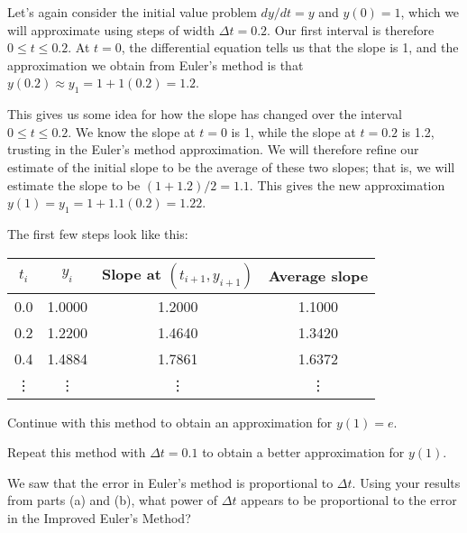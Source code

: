 \begin{exercises}
    Let's again consider the initial value problem $dy/dt = y$ and
    $y(0) = 1$, which we will approximate using steps of width $\Delta
    t = 0.2$.  Our first interval is therefore $0\leq t \leq 0.2$.  At
    $t=0$, the differential equation tells us that the slope is 1, and
    the approximation we obtain from Euler's method is that
    $y(0.2)\approx y_1= 1+ 1(0.2)= 1.2$.  

    This gives us some idea for how the slope has changed over the
    interval $0\leq t\leq 0.2$.  We know the slope at $t=0$ is 1,
    while the slope at $t=0.2$ is 1.2, trusting in the Euler's method
    approximation.  We will therefore refine our estimate of the
    initial slope to be the average of these two slopes;  that is, we
    will estimate the slope to be $(1+1.2)/2 = 1.1$.  This gives the
    new approximation $y(1) = y_1 = 1 + 1.1(0.2) = 1.22$.  

    The first few steps look like this:
    \begin{center}
      \begin{tabular}{|c|c|c|c|}
        \hline
        $t_i$ & $y_i$ & Slope at $(t_{i+1},y_{i+1})$ & Average slope \\
        \hline
        0.0&1.0000&1.2000&1.1000\\
        0.2&1.2200&1.4640&1.3420\\
        0.4&1.4884&1.7861&1.6372\\
        \vdots &  \vdots &  \vdots &  \vdots \\
        \hline
      \end{tabular}
    \end{center}

\ba
	\item Continue with this method to obtain an approximation for $y(1) =
    e$. 

    \item  Repeat this method with $\Delta t = 0.1$ to obtain a better
    approximation for $y(1)$.

\item   We saw that the error in Euler's method is proportional to
    $\Delta t$.  Using your results from parts (a) and (b), what power
    of $\Delta t$ appears to be proportional to the error in the
    Improved Euler's Method?
        \ea
        
\end{exercises}
\afterexercises
